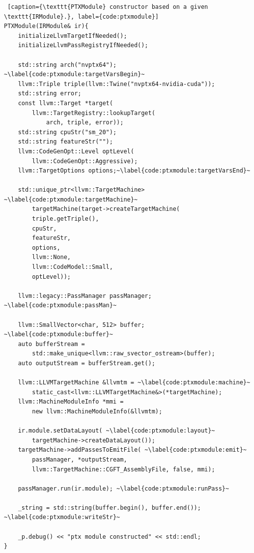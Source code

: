 \begin{lstlisting} [caption={\texttt{PTXModule} constructor based on a given \texttt{IRModule}.}, label={code:ptxmodule}]
PTXModule(IRModule& ir){
    initializeLlvmTargetIfNeeded();
    initializeLlvmPassRegistryIfNeeded();

    std::string arch("nvptx64"); ~\label{code:ptxmodule:targetVarsBegin}~
    llvm::Triple triple(llvm::Twine("nvptx64-nvidia-cuda"));
    std::string error;
    const llvm::Target *target(
        llvm::TargetRegistry::lookupTarget(
            arch, triple, error));
    std::string cpuStr("sm_20");
    std::string featureStr("");
    llvm::CodeGenOpt::Level optLevel(
        llvm::CodeGenOpt::Aggressive);
    llvm::TargetOptions options;~\label{code:ptxmodule:targetVarsEnd}~

    std::unique_ptr<llvm::TargetMachine> ~\label{code:ptxmodule:targetMachine}~
        targetMachine(target->createTargetMachine(
        triple.getTriple(), 
        cpuStr, 
        featureStr, 
        options, 
        llvm::None, 
        llvm::CodeModel::Small, 
        optLevel));

    llvm::legacy::PassManager passManager; ~\label{code:ptxmodule:passMan}~

    llvm::SmallVector<char, 512> buffer; ~\label{code:ptxmodule:buffer}~
    auto bufferStream = 
        std::make_unique<llvm::raw_svector_ostream>(buffer);
    auto outputStream = bufferStream.get();

    llvm::LLVMTargetMachine &llvmtm = ~\label{code:ptxmodule:machine}~
        static_cast<llvm::LLVMTargetMachine&>(*targetMachine);
    llvm::MachineModuleInfo *mmi = 
        new llvm::MachineModuleInfo(&llvmtm);

    ir.module.setDataLayout( ~\label{code:ptxmodule:layout}~
        targetMachine->createDataLayout());
    targetMachine->addPassesToEmitFile( ~\label{code:ptxmodule:emit}~
        passManager, *outputStream, 
        llvm::TargetMachine::CGFT_AssemblyFile, false, mmi);

    passManager.run(ir.module); ~\label{code:ptxmodule:runPass}~

    _string = std::string(buffer.begin(), buffer.end()); ~\label{code:ptxmodule:writeStr}~

    _p.debug() << "ptx module constructed" << std::endl;
}
\end{lstlisting}
